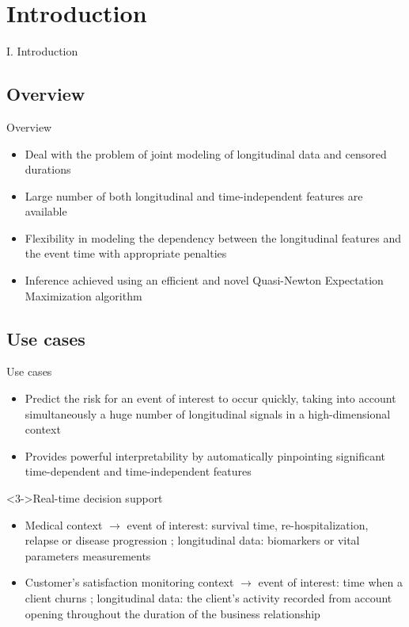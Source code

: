 \documentclass{beamer}
\begin{document}
\section{Introduction}

\begin{frame}[noframenumbering]
\Large \centering
\textcolor{blue_pres}{I.} Introduction
\end{frame}

\subsection{Overview}

\begin{frame}{Overview}

\begin{itemize}
  \item<1-> Deal with the problem of joint modeling of longitudinal data and censored durations
  \item<2-> Large number of both longitudinal and time-independent features are available
  \item<3-> Flexibility in modeling the dependency between the longitudinal features and the event time with appropriate penalties
  \item<4-> Inference achieved using an efficient and novel Quasi-Newton Expectation Maximization algorithm
\end{itemize}

\end{frame}

\subsection{Use cases}

\begin{frame}{Use cases}

\small
\begin{itemize}
  \item<1-> Predict the risk for an event of interest to occur quickly, taking into account simultaneously a huge number of longitudinal signals in a high-dimensional context
  \item<2-> Provides powerful interpretability by automatically pinpointing significant time-dependent and time-independent features
\end{itemize}

\begin{block}<3->{Real-time decision support}
\begin{itemize}
  \item<3-> Medical context $\rightarrow$ event of interest: survival time, re-hospitalization, relapse or disease progression ; longitudinal data: biomarkers or vital parameters measurements
  \item<4-> Customer's satisfaction monitoring context $\rightarrow$ event of interest: time when a client churns ; longitudinal data: the client's activity recorded from account opening throughout the duration of the business relationship
\end{itemize}
\end{block}

\end{frame}
\end{document}
